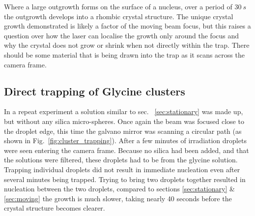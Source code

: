 Where a large outgrowth forms on the surface of a nucleus,
over a period of $30\ s$ the outgrowth develops into a 
rhombic crystal structure. The unique crystal growth 
demonstrated is likely a factor of the moving beam focus,
but this raises a question over how the laser can localise
the growth only around the focus and why the crystal does 
not grow or shrink when not directly within the trap. There
should be some material that is being drawn into the trap
as it scans across the camera frame.

\subsection{Direct trapping of Glycine clusters}
\label{sec:clusters}
In a repeat experiment a solution similar to sec.~
\ref{sec:stationary} was made up, but without any 
silica micro-spheres. Once again the beam was focused 
close to the droplet edge, this time the galvano 
mirror was scanning a circular path (as shown in Fig.~\ref{fig:cluster_trapping}). After a few 
minutes of irradiation droplets were seen entering 
the camera frame. Because no silica had been added, 
and that the solutions were filtered, these droplets 
had to be from the glycine solution. Trapping 
individual droplets did not result in immediate 
nucleation even after several minutes being trapped. 
Trying to bring two droplets together resulted in 
nucleation between the two droplets, compared to sections
\ref{sec:stationary} \& \ref{sec:moving} the growth 
is much slower, taking nearly 40 seconds before the 
crystal structure becomes clearer.
